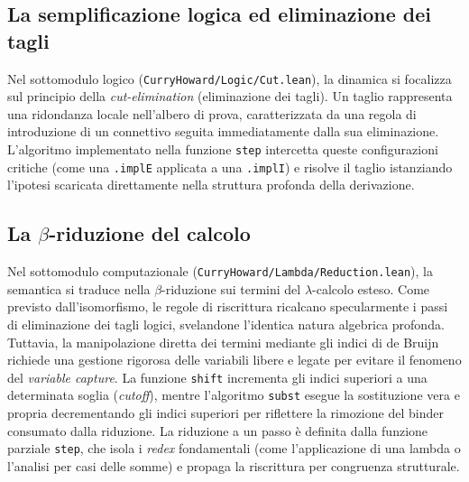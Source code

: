 \subsection{La semplificazione logica ed eliminazione dei tagli}
Nel sottomodulo logico (\texttt{CurryHoward/Logic/Cut.lean}), la dinamica si focalizza sul principio della \emph{cut-elimination} (eliminazione dei tagli). Un taglio rappresenta una ridondanza locale nell'albero di prova, caratterizzata 
da una regola di introduzione di un connettivo seguita immediatamente dalla sua eliminazione. L'algoritmo implementato nella funzione \texttt{step} intercetta queste configurazioni critiche (come una \texttt{.implE} applicata a una \texttt{.implI}) 
e risolve il taglio istanziando l'ipotesi scaricata direttamente nella struttura profonda della derivazione.

\subsection{La \texorpdfstring{$\beta$}{Beta}-riduzione del calcolo}
Nel sottomodulo computazionale (\texttt{CurryHoward/Lambda/Reduction.lean}), la semantica si traduce nella $\beta$-riduzione sui termini del $\lambda$-calcolo esteso. Come previsto dall'isomorfismo, le regole di riscrittura ricalcano specularmente i 
passi di eliminazione dei tagli logici, svelandone l'identica natura algebrica profonda. Tuttavia, la manipolazione diretta dei termini mediante gli indici di de Bruijn richiede una gestione rigorosa delle variabili libere e legate per evitare il 
fenomeno del \emph{variable capture}. La funzione \texttt{shift} incrementa gli indici superiori a una determinata soglia (\emph{cutoff}), mentre l'algoritmo \texttt{subst} esegue la sostituzione vera e propria decrementando gli indici superiori per 
riflettere la rimozione del binder consumato dalla riduzione. La riduzione a un passo è definita dalla funzione parziale \texttt{step}, che isola i \emph{redex} fondamentali (come l'applicazione di una lambda o l'analisi per casi delle somme) e propaga 
la riscrittura per congruenza strutturale.

